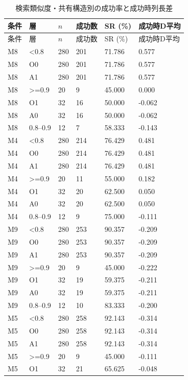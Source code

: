 {\scriptsize\setlength{\tabcolsep}{3pt}
\begin{longtable}{llllll}
\caption{検索類似度・共有構造別の成功率と成功時列長差}\label{tab:retrieval_strata}\\
\hline
条件 & 層 & $n$ & 成功数 & SR (\%) & 成功時D平均\\\hline\endfirsthead
条件 & 層 & $n$ & 成功数 & SR (\%) & 成功時D平均\\\hline\endhead
\hline\endfoot
M8 & \textless{}0.8 & 280 & 201 & 71.786 & 0.577 \\
M8 & O0 & 280 & 201 & 71.786 & 0.577 \\
M8 & A1 & 280 & 201 & 71.786 & 0.577 \\
M8 & \textgreater{}=0.9 & 20 & 9 & 45.000 & 0.000 \\
M8 & O1 & 32 & 16 & 50.000 & -0.062 \\
M8 & A0 & 32 & 16 & 50.000 & -0.062 \\
M8 & 0.8–0.9 & 12 & 7 & 58.333 & -0.143 \\
M4 & \textless{}0.8 & 280 & 214 & 76.429 & 0.481 \\
M4 & O0 & 280 & 214 & 76.429 & 0.481 \\
M4 & A1 & 280 & 214 & 76.429 & 0.481 \\
M4 & \textgreater{}=0.9 & 20 & 11 & 55.000 & 0.182 \\
M4 & O1 & 32 & 20 & 62.500 & 0.050 \\
M4 & A0 & 32 & 20 & 62.500 & 0.050 \\
M4 & 0.8–0.9 & 12 & 9 & 75.000 & -0.111 \\
M9 & \textless{}0.8 & 280 & 253 & 90.357 & -0.209 \\
M9 & O0 & 280 & 253 & 90.357 & -0.209 \\
M9 & A1 & 280 & 253 & 90.357 & -0.209 \\
M9 & \textgreater{}=0.9 & 20 & 9 & 45.000 & -0.222 \\
M9 & O1 & 32 & 19 & 59.375 & -0.211 \\
M9 & A0 & 32 & 19 & 59.375 & -0.211 \\
M9 & 0.8–0.9 & 12 & 10 & 83.333 & -0.200 \\
M5 & \textless{}0.8 & 280 & 258 & 92.143 & -0.314 \\
M5 & O0 & 280 & 258 & 92.143 & -0.314 \\
M5 & A1 & 280 & 258 & 92.143 & -0.314 \\
M5 & \textgreater{}=0.9 & 20 & 9 & 45.000 & -0.111 \\
M5 & O1 & 32 & 21 & 65.625 & -0.048 \\

\end{longtable}}
